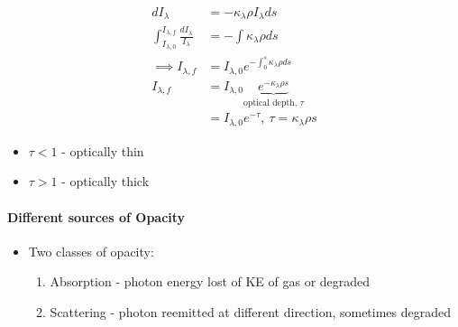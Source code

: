\documentclass[a4paper,11pt,normalem]{article}
\begin{document}
\[
    \begin{aligned}
    dI_\lambda &= - \kappa_\lambda \rho I_{\lambda} ds \\
    \int_{I_{\lambda, 0}}^{I_{\lambda, f}} \frac{dI_{\lambda}}{I_{\lambda}} &= - \int \kappa_{\lambda} \rho ds \\
    \implies I_{\lambda, f} &= I_{\lambda, 0}e^{-\int_0^s \kappa_{\lambda}\rho ds} \\
    I_{\lambda, f} &= I_{\lambda, 0}\underbrace{e^{-\kappa_\lambda \rho s}}_{\text{optical depth, }\tau} \\
    &= I_{\lambda, 0}e^{-\tau}, ~ \tau = \kappa_{\lambda}\rho s
    \end{aligned}
\]

\begin{itemize}
\item
  \(\tau < 1\) - optically thin
\item
  \(\tau > 1\) - optically thick
\end{itemize}

\paragraph{Different sources of
Opacity}\label{different-sources-of-opacity}

\begin{itemize}
\item
  Two classes of opacity:

  \begin{enumerate}
  \def\labelenumi{\arabic{enumi}.}
  \item
    Absorption - photon energy lost of KE of gas or degraded
  \item
    Scattering - photon reemitted at different direction, sometimes
    degraded
  \end{enumerate}
\end{itemize}
\end{document}
